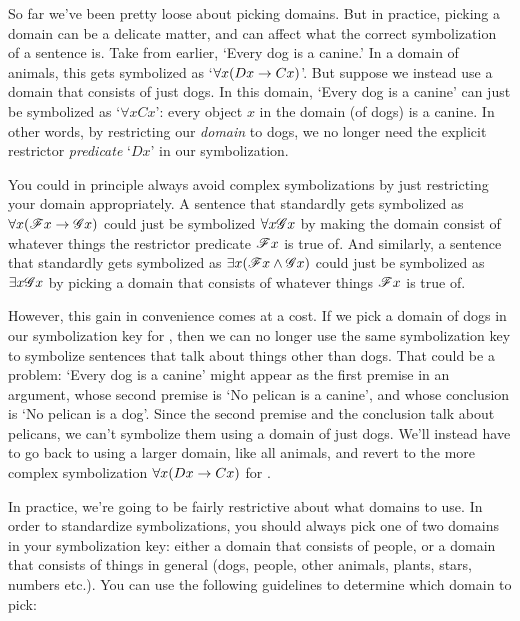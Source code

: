 So far we've been pretty loose about picking domains.  But in practice, picking a domain can be a delicate matter, and can affect what the correct symbolization of a sentence is.  Take  from earlier, `Every dog is a canine.'  In a domain of animals, this gets symbolized as `$\forall x (Dx \rightarrow Cx)$'.  But suppose we instead use a domain that consists of just dogs.  In this domain, `Every dog is a canine' can just be symbolized as `$\forall xCx$': every object $x$ in the domain (of dogs) is a canine.  In other words, by restricting our \emph{domain} to dogs, we no longer need the explicit restrictor \emph{predicate} `$Dx$' in our symbolization.


You could in principle always avoid complex symbolizations by just restricting your domain appropriately.  A sentence that standardly gets symbolized as $\forall x (\mathscr{F}x \rightarrow \mathscr{G}x)$ could just be symbolized $\forall x \mathscr{G}x$ by making the domain consist of whatever things the restrictor predicate $\mathscr{F}x$ is true of.  And similarly, a sentence that standardly gets symbolized as $\exists x (\mathscr{F}x \wedge \mathscr{G}x)$ could just be symbolized as $\exists x \mathscr{G}x$ by picking a domain that consists of whatever things $\mathscr{F}x$ is true of.

However, this gain in convenience comes at a cost.  If we pick a domain of dogs in our symbolization key for , then we can no longer use the same symbolization key to symbolize sentences that talk about things other than dogs.  That could be a problem: `Every dog is a canine' might appear as the first premise in an argument, whose second premise is `No pelican is a canine', and whose conclusion is `No pelican is a dog'.  Since the second premise and the conclusion talk about pelicans, we can't symbolize them using a domain of just dogs.  We'll instead have to go back to using a larger domain, like all animals, and revert to the more complex symbolization  $\forall x (Dx \rightarrow Cx)$ for .

In practice, we're going to be fairly restrictive about what domains to use.  In order to standardize symbolizations, you should always pick one of two domains in your symbolization key: either a domain that consists of people, or a domain that consists of things in general (dogs, people, other animals, plants, stars, numbers etc.).  You can use the following guidelines to determine which domain to pick:

